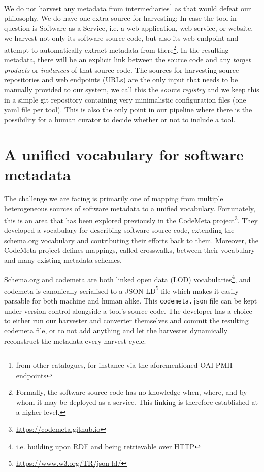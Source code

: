 \documentclass[a4paper,11pt]{article}
\begin{document}
We do not harvest any metadata from intermediaries\footnote{from other catalogues,
for instance via the aforementioned OAI-PMH endpoints} as that would defeat our philosophy. We do
have one extra source for harvesting: In case the tool in question is Software
as a Service, i.e. a web-application, web-service, or website, we harvest not
only its software source code, but also its web endpoint and attempt to
automatically extract metadata from there\footnote{Formally, the software
source code has no knowledge when, where, and by whom it may be deployed as a
service. This linking is therefore established at a higher level.}. In the
resulting metadata, there will be an explicit link between the source code and
any \emph{target products} or \emph{instances} of that source code. The sources
for harvesting source repositories and web endpoints (URLs) are the only input
that needs to be manually provided to our system, we call this the \emph{source
registry} and we keep this in a simple git repository containing very
minimalistic configuration files (one yaml file per tool). This is also the
only point in our pipeline where there is the possibility for a human curator
to decide whether or not to include a tool.

\section{A unified vocabulary for software metadata}

The challenge we are facing is primarily one of mapping from multiple
heterogeneous sources of software metadata to a unified vocabulary.
Fortunately, this is an area that has been explored previously in the CodeMeta
project\footnote{\url{https://codemeta.github.io}}. They developed a
vocabulary for describing software source code, extending the
schema.org vocabulary and contributing their efforts back to them. Moreover,
the CodeMeta project defines mappings, called crosswalks, between their
vocabulary and many existing metadata schemes. 

Schema.org and codemeta are both linked open data (LOD)
vocabularies\footnote{i.e. building upon RDF and being retrievable over HTTP},
and codemeta is canonically serialised to a
JSON-LD\footnote{\url{https://www.w3.org/TR/json-ld/}} file which makes it
easily parsable for both machine and human alike. This \texttt{codemeta.json}
file can be kept under version control alongside a tool's source code. The
developer has a choice to either run our harvester and converter themselves and
commit the resulting codemeta file, or to not add anything and let the harvester
dynamically reconstruct the metadata every harvest cycle.
\end{document}
